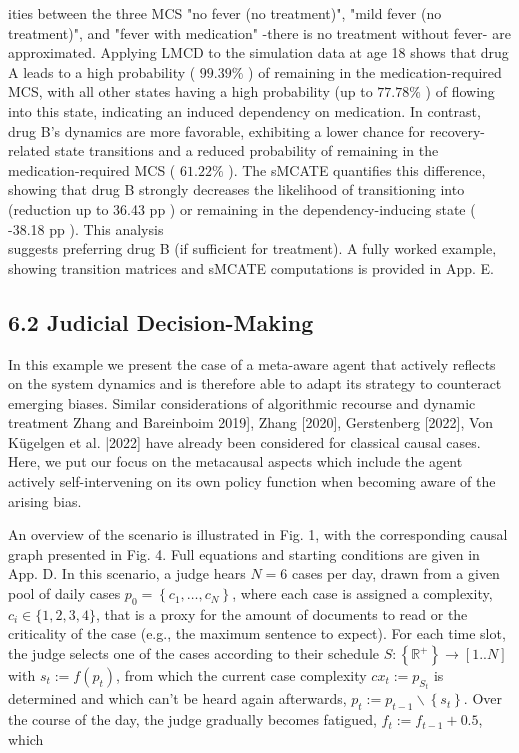 \documentclass[10pt]{article}
\begin{document}
ities between the three MCS "no fever (no treatment)", "mild fever (no treatment)", and "fever with medication" -there is no treatment without fever- are approximated. Applying LMCD to the simulation data at age 18 shows that drug A leads to a high probability ( $99.39 \%$ ) of remaining in the medication-required MCS, with all other states having a high probability (up to $77.78 \%$ ) of flowing into this state, indicating an induced dependency on medication. In contrast, drug B's dynamics are more favorable, exhibiting a lower chance for recovery-related state transitions and a reduced probability of remaining in the medication-required MCS ( $61.22 \%$ ). The sMCATE quantifies this difference, showing that drug B strongly decreases the likelihood of transitioning into (reduction up to 36.43 pp ) or remaining in the dependency-inducing state ( -38.18 pp ). This analysis\\
suggests preferring drug B (if sufficient for treatment). A fully worked example, showing transition matrices and sMCATE computations is provided in App. E.

\subsection*{6.2 Judicial Decision-Making}
In this example we present the case of a meta-aware agent that actively reflects on the system dynamics and is therefore able to adapt its strategy to counteract emerging biases. Similar considerations of algorithmic recourse and dynamic treatment Zhang and Bareinboim 2019], Zhang [2020], Gerstenberg [2022], Von Kügelgen et al. |2022] have already been considered for classical causal cases. Here, we put our focus on the metacausal aspects which include the agent actively self-intervening on its own policy function when becoming aware of the arising bias.

An overview of the scenario is illustrated in Fig. 1, with the corresponding causal graph presented in Fig. 4. Full equations and starting conditions are given in App. D. In this scenario, a judge hears $N=6$ cases per day, drawn from a given pool of daily cases $p_{0}=\left\{c_{1}, \ldots, c_{N}\right\}$, where each case is assigned a complexity, $c_{i} \in\{1,2,3,4\}$, that is a proxy for the amount of documents to read or the criticality of the case (e.g., the maximum sentence to expect). For each time slot, the judge selects one of the cases according to their schedule $S:\left\{\mathbb{R}^{+}\right\} \rightarrow[1 . . N]$ with $s_{t}:=f\left(p_{t}\right)$, from which the current case complexity $c x_{t}:=p_{S_{t}}$ is determined and which can't be heard again afterwards, $p_{t}:=p_{t-1} \backslash\left\{s_{t}\right\}$. Over the course of the day, the judge gradually becomes fatigued, $f_{t}:=f_{t-1}+0.5$, which
\end{document}
